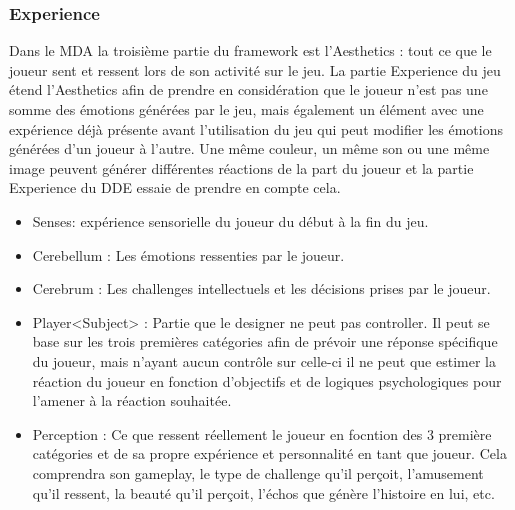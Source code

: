 \subsubsection{Experience}
    Dans le MDA la troisième partie du framework est l'Aesthetics : tout ce que le joueur sent et ressent lors de son activité sur le jeu. La partie Experience du jeu étend l'Aesthetics afin de prendre en considération que le joueur n'est pas une somme des émotions générées par le jeu, mais également un élément avec une expérience déjà présente avant l'utilisation du jeu qui peut modifier les émotions générées d'un joueur à l'autre. Une même couleur, un même son ou une même image peuvent générer différentes réactions de la part du joueur et la partie Experience du DDE essaie de prendre en compte cela.
    \begin{itemize}
        \item Senses: expérience sensorielle du joueur du début à la fin du jeu.
        \item Cerebellum : Les émotions ressenties par le joueur.
        \item Cerebrum : Les challenges intellectuels et les décisions prises par le joueur.
        \item Player<Subject> : Partie que le designer ne peut pas controller. Il peut se base sur les trois premières catégories afin de prévoir une réponse spécifique du joueur, mais n'ayant aucun contrôle sur celle-ci il ne peut que estimer la réaction du joueur en fonction d'objectifs et de logiques psychologiques pour l'amener à la réaction souhaitée.
        \item Perception : Ce que ressent réellement le joueur en focntion des 3 première catégories et de sa propre expérience et personnalité en tant que joueur. Cela comprendra son gameplay, le type de challenge qu'il perçoit, l'amusement qu'il ressent, la beauté qu'il perçoit, l'échos que génère l'histoire en lui, etc.
    \end{itemize}



